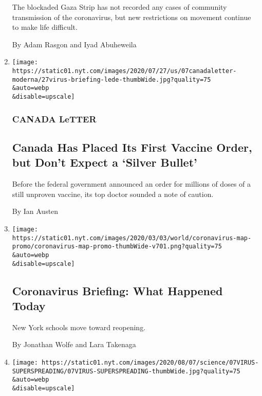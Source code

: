 \begin{enumerate}
  The blockaded Gaza Strip has not recorded any cases of community
  transmission of the coronavirus, but new restrictions on movement
  continue to make life difficult.

  By Adam Rasgon and Iyad Abuheweila
\item
  \href{/2020/08/07/world/canada/canada-letter-vaccine.html}{}

  \texttt{[image: https://static01.nyt.com/images/2020/07/27/us/07canadaletter-moderna/27virus-briefing-lede-thumbWide.jpg?quality=75\\\&auto=webp\\\&disable=upscale]}

  \hypertarget{canada-letter}{%
  \subsubsection{CANADA LeTTER}\label{canada-letter}}

  \hypertarget{canada-has-placed-its-first-vaccine-order-but-dont-expect-a-silver-bullet}{%
  \subsection{Canada Has Placed Its First Vaccine Order, but Don't
  Expect a `Silver
  Bullet'}\label{canada-has-placed-its-first-vaccine-order-but-dont-expect-a-silver-bullet}}

  Before the federal government announced an order for millions of doses
  of a still unproven vaccine, its top doctor sounded a note of caution.

  By Ian Austen
\item
  \href{/2020/08/07/us/coronavirus-today.html}{}

  \texttt{[image: https://static01.nyt.com/images/2020/03/03/world/coronavirus-map-promo/coronavirus-map-promo-thumbWide-v701.png?quality=75\\\&auto=webp\\\&disable=upscale]}

  \hypertarget{coronavirus-briefing-what-happened-today}{%
  \subsection{Coronavirus Briefing: What Happened
  Today}\label{coronavirus-briefing-what-happened-today}}

  New York schools move toward reopening.

  By Jonathan Wolfe and Lara Takenaga
\item
  \href{/2020/08/07/health/coronavirus-superspreading-contagion.html}{}

  \texttt{[image: https://static01.nyt.com/images/2020/08/07/science/07VIRUS-SUPERSPREADING/07VIRUS-SUPERSPREADING-thumbWide.jpg?quality=75\\\&auto=webp\\\&disable=upscale]}


\end{enumerate}

